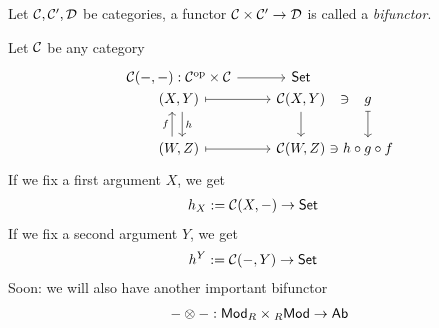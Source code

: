\documentclass[a4paper]{report}
\begin{document}
\begin{defi}
  Let $\mathcal{C}, \mathcal{C}', \mathcal{D}$ be categories, a functor $\mathcal{C} \times \mathcal{C}' \to \mathcal{D}$ is called a \emph{bifunctor}.
\end{defi}
\begin{exmp}
  Let $\mathcal{C}$ be any category
  \[\begin{tikzcd}
{\mathcal C(-,-): \mathcal C^{\mathrm{op}} \times \mathcal C} \arrow[r] & \mathsf{Set}                  &[-20pt]                      \\[-20pt]
{(X,Y)} \arrow[r, maps to] \arrow[d, "h", shift left]                   & {\mathcal C (X, Y)} \arrow[d] \arrow[r, phantom, "\ni"]& g \arrow[d, maps to] \\
{(W,Z)} \arrow[r, maps to] \arrow[u, "f", shift left=2]                 & {\mathcal C (W,Z)} \arrow[r, phantom, "\ni"]           & h \circ g \circ f
\end{tikzcd}
  \]
  If we fix a first argument $X$, we get \begin{align*}
h_{X}:= \mathcal{C}(X,-) &\to \mathsf{Set}
  \end{align*}
  If we fix a second argument $Y$, we get \begin{align*}
h^{Y}:=\mathcal{C}(-,Y) &\to \mathsf{Set}
  \end{align*}
  Soon: we will also have another important bifunctor \begin{align*}
- \otimes - : \mathsf{Mod}_{R} \times {}_{R}\mathsf{Mod} \to \mathsf{Ab}
  \end{align*}
\end{exmp}
\end{document}
